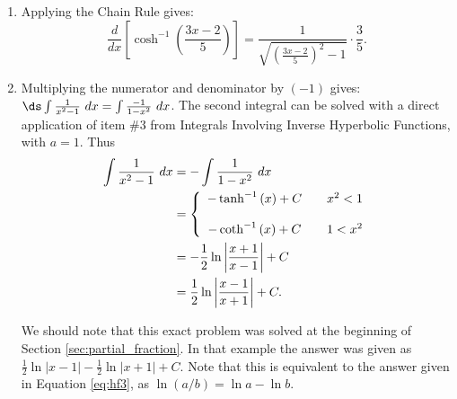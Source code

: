 \begin{solution}
{\begin{enumerate}
\item	Applying the Chain Rule gives:
		$$\frac{d}{dx}\left[\cosh^{-1}\left(\frac{3x-2}5\right)\right] = \frac{1}{\sqrt{\left(\frac{3x-2}5\right)^2-1}}\cdot\frac35.$$

\item		Multiplying the numerator and denominator by $(-1)$ gives: $\ds \int \frac{1}{x^2-1}\ dx = \int \frac{-1}{1-x^2}\ dx$. The second integral can be solved with a direct application of item \#3 from Integrals Involving Inverse Hyperbolic Functions, with $a=1$. Thus
\begin{align}
\int \frac{1}{x^2-1}\ dx &= -\int \frac{1}{1-x^2}\ dx \notag \\
		&= \left\{\begin{array}{ccc} -\tanh^{-1}\left(x\right)+C & & x^2<1 \\ \\
-\coth^{-1}\left(x\right)+C & & 1<x^2 \end{array}\right. \notag\\
     &=-\frac12\ln\left|\frac{x+1}{x-1}\right|+C\notag\\
     &=\frac12\ln\left|\frac{x-1}{x+1}\right|+C.\label{eq:hf3}
     \end{align}

We should note that this exact problem was solved at the beginning of Section \ref{sec:partial_fraction}. In that example the answer was given as $\frac12\ln|x-1|-\frac12\ln|x+1|+C.$ Note that this is equivalent to the answer given in Equation \ref{eq:hf3}, as $\ln(a/b) = \ln a - \ln b$.

%


\end{enumerate}}
\end{solution}
